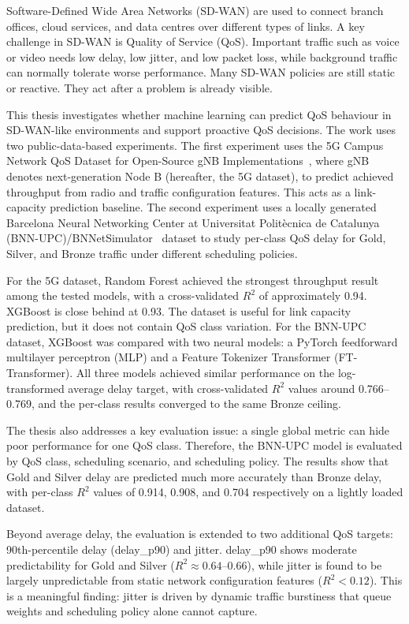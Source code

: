 \documentclass[a4paper,12pt]{Classes/RoboticsLaTeX}
\begin{document}
	
	\begin{abstracts}
Software-Defined Wide Area Networks (SD-WAN) are used to connect branch offices, cloud services, and data centres over different types of links. A key challenge in SD-WAN is Quality of Service (QoS). Important traffic such as voice or video needs low delay, low jitter, and low packet loss, while background traffic can normally tolerate worse performance. Many SD-WAN policies are still static or reactive. They act after a problem is already visible.

This thesis investigates whether machine learning can predict QoS behaviour in SD-WAN-like environments and support proactive QoS decisions. The work uses two public-data-based experiments. The first experiment uses the 5G Campus Network QoS Dataset for Open-Source gNB Implementations~\cite{raffeck2024zenodo}, where gNB denotes next-generation Node B (hereafter, the 5G dataset), to predict achieved throughput from radio and traffic configuration features. This acts as a link-capacity prediction baseline. The second experiment uses a locally generated Barcelona Neural Networking Center at Universitat Polit\`ecnica de Catalunya (BNN-UPC)/BNNetSimulator~\cite{ferriolgalmes2022routenetfermi} dataset to study per-class QoS delay for Gold, Silver, and Bronze traffic under different scheduling policies.

For the 5G dataset, Random Forest achieved the strongest throughput result among the tested models, with a cross-validated $R^2$ of approximately 0.94. XGBoost is close behind at 0.93. The dataset is useful for link capacity prediction, but it does not contain QoS class variation. For the BNN-UPC dataset, XGBoost was compared with two neural models: a PyTorch feedforward multilayer perceptron (MLP) and a Feature Tokenizer Transformer (FT-Transformer). All three models achieved similar performance on the log-transformed average delay target, with cross-validated $R^2$ values around 0.766--0.769, and the per-class results converged to the same Bronze ceiling.

The thesis also addresses a key evaluation issue: a single global metric can hide poor performance for one QoS class. Therefore, the BNN-UPC model is evaluated by QoS class, scheduling scenario, and scheduling policy. The results show that Gold and Silver delay are predicted much more accurately than Bronze delay, with per-class $R^2$ values of 0.914, 0.908, and 0.704 respectively on a lightly loaded dataset.

Beyond average delay, the evaluation is extended to two additional QoS targets: 90th-percentile delay (delay\_p90) and jitter. delay\_p90 shows moderate predictability for Gold and Silver ($R^2 \approx 0.64$--0.66), while jitter is found to be largely unpredictable from static network configuration features ($R^2 < 0.12$). This is a meaningful finding: jitter is driven by dynamic traffic burstiness that queue weights and scheduling policy alone cannot capture.


\end{abstracts}
\end{document}
